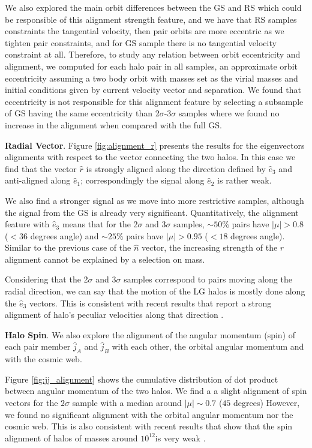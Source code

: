 \documentclass{emulateapj}
\newcommand{\Msun}{{\ifmmode{{\rm {M_{\odot}}}}\else{${\rm{M_{\odot}}}$}\fi}}
\begin{document}
We also explored the main orbit differences between the GS and RS  which could be
responsible of this alignment strength feature, and we have that RS samples constraints
the tangential velocity, then pair orbits are more eccentric as we tighten pair
constraints, and for GS sample there is no tangential velocity constraint at all.
Therefore, to study any relation between orbit eccentricity and alignment, we 
computed for each halo pair in all samples, an approximate orbit 
eccentricity assuming a two body orbit with masses set as the virial 
masses and initial conditions given by current velocity vector and separation.
We found that eccentricity is not responsible for this alignment feature by
selecting a subsample of GS having the same eccentricity than 
2$\sigma$-3$\sigma$ samples where we found no increase in the alignment when
compared with the full GS. 


{\bf Radial Vector}.  Figure \ref{fig:alignment_r} presents the
results for the eigenvectors alignments with respect to the vector
connecting the two halos. 
In this case we find that the vector $\hat{r}$
is strongly aligned along the direction defined by
$\hat{e}_3$ and anti-aligned along $\hat{e}_1$; correspondingly the
signal along $\hat{e}_2$ is rather weak. 

We also find a stronger signal as we move into more restrictive
samples, although the signal from the GS is already very
significant. 
Quantitatively, the alignment feature with $\hat{e}_3$
means that for the 2$\sigma$ and 3$\sigma$ samples, $\sim 50\%$ pairs
have $|\mu|>0.8$ ($<36$ degrees angle) and $\sim 25\%$ pairs have
$|\mu|>0.95$ ($<18$ degrees angle). Similar to the previous case of
the $\hat{n}$ vector, the increasing strength of the
$\hat{r}$ alignment cannot be explained by a selection on mass. 

Considering that the 2$\sigma$ and 3$\sigma$ samples correspond to
pairs moving along the radial direction, we can say that the
motion of the LG halos is mostly done along the $\hat{e}_3$
vectors. This is consistent with recent results that report a strong
alignment of halo's peculiar velocities along that direction
\citep{ForeroRomero2014}. 

{\bf Halo Spin}. We also explore the alignment of the  angular
momentum (spin) of each pair member $\hat{j}_A$ and $\hat{j}_B$ with
each other, the orbital angular momentum and with the cosmic web. 

Figure \ref{fig:jj_alignment} shows the cumulative distribution of dot
product between angular momentum of the  two halos. We find a a slight
alignment of spin vectors for the $2\sigma$ sample with a median around
$|\mu|\sim 0.7$ ($45$ degrees) However, we found no significant
alignment with the orbital angular momentum nor the cosmic web. This
is also consistent with recent results that show that the spin
alignment of halos of masses around $10^{12}$\Msun is very weak
\citep{ForeroRomero2014}. 
 
\end{document}
